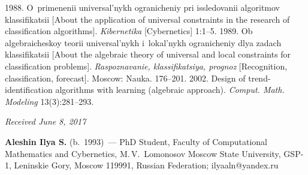 \begin{multicols}{2}
{{\begin{thebibliography}{99}
 1988. O~primenenii universal'nykh ogranicheniy pri issledovanii 
algoritmov klassifikatsii [About the application of universal constraints in the 
research of classification algorithms]. \textit{Kibernetika} [Cybernetics] 1:1--5.
 1989. Ob algebraicheskoy teorii universal'nykh 
i~lokal'nykh ogranicheniy dlya zadach klassifikatsii [About the algebraic 
theory of universal and local constraints for classification problems].
\textit{Raspoznavanie, klassifikatsiya, prognoz} 
[Recognition, classification, forecast]. Moscow: Nauka. 176--201.
2002. Design of trend-identification algorithms with learning (algebraic approach).
 \textit{Comput. Math. Modeling} 13(3):281--293.

\end{thebibliography}

 }
 }

\end{multicols}

\vspace*{-6pt}

\hfill{\small\textit{Received June 8, 2017}}


\Contrl

\noindent
\textbf{Aleshin Ilya  S.} (b.\ 1993)~--- 
PhD Student, Faculty of Computational Mathematics and Cybernetics, 
M.\,V.~Lomonosov Moscow State University, GSP-1, Leninskie Gory, 
Moscow 119991, Russian Federation; \mbox{ilyaaln@yandex.ru}

\label{end\stat}


\renewcommand{\bibname}{\protect\rm Литература} 